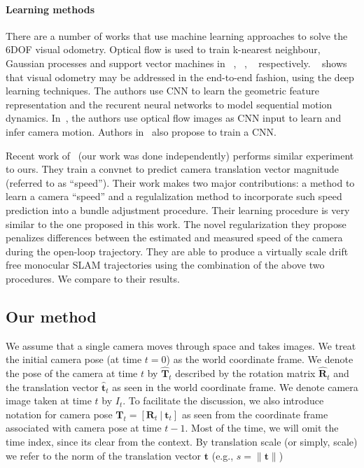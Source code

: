 \paragraph{Learning methods} There are a number of works that use
machine learning approaches to solve the 6DOF visual odometry.
Optical flow is used to train k-nearest neighbour, Gaussian processes
and support vector machines in ~\cite{roberts2008memory},
~\cite{guizilini2013semi}, ~\cite{CIARFUGLIA20141717}
respectively. ~\cite{wang2017deepvo} shows that visual odometry may be
addressed in the end-to-end fashion, using the deep learning
techniques. The authors use CNN to learn the geometric feature
representation and the recurent neural networks to model sequential
motion dynamics. In~\cite{muller2017flowdometry}, the authors use
optical flow images as CNN input to learn and infer camera
motion. Authors in~\cite{DBLP:journals/corr/MohantyADGSC16} also
propose to train a CNN.

Recent work of~\cite{frost2016} (our work was done independently)
performs similar experiment to ours.  They train a convnet to predict
camera translation vector magnitude (referred to as ``speed'').  Their
work makes two major contributions: a method to learn a camera
``speed'' and a regulalization method to incorporate such speed
prediction into a bundle adjustment procedure.  Their learning
procedure is very similar to the one proposed in this work.  The novel
regularization they propose penalizes differences between the
estimated and measured speed of the camera during the open-loop
trajectory. They are able to produce a virtually scale drift free
monocular SLAM trajectories using the combination of the above two
procedures.  We compare to their results.

\subsection{Our method}

We assume that a single camera moves through space and takes images.
We treat the initial camera pose (at time $t=0$) as the world
coordinate frame.  We denote the pose of the camera at time $t$ by
$\mathbf{\hat{T}}_t$ described by the rotation matrix
$\mathbf{\hat{R}}_t$ and the translation vector $\mathbf{\hat{t}}_t$
as seen in the world coordinate frame.  We denote camera image taken
at time $t$ by $I_t$.  To facilitate the discussion, we also introduce
notation for camera pose
$\mathbf{T}_t = [\mathbf{R}_t\ |\ \mathbf{t}_t] $ as seen from the
coordinate frame associated with camera pose at time $t-1$.  Most of
the time, we will omit the time index, since its clear from the
context.  By translation scale (or simply, scale) we refer to the norm
of the translation vector $\mathbf{t}$ (e.g.,
$s = \lVert \mathbf{t} \rVert$)

